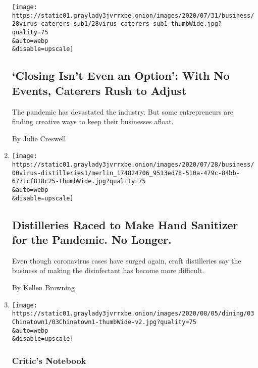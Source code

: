 \begin{enumerate}
  \texttt{[image: https://static01.graylady3jvrrxbe.onion/images/2020/07/31/business/28virus-caterers-sub1/28virus-caterers-sub1-thumbWide.jpg?quality=75\\\&auto=webp\\\&disable=upscale]}

  \hypertarget{closing-isnt-even-an-option-with-no-events-caterers-rush-to-adjust}{%
  \subsection{`Closing Isn't Even an Option': With No Events, Caterers
  Rush to
  Adjust}\label{closing-isnt-even-an-option-with-no-events-caterers-rush-to-adjust}}

  The pandemic has devastated the industry. But some entrepreneurs are
  finding creative ways to keep their businesses afloat.

  By Julie Creswell
\item
  \href{/2020/08/04/business/distilleries-hand-sanitizer-pandemic.html}{}

  \texttt{[image: https://static01.graylady3jvrrxbe.onion/images/2020/07/28/business/00virus-distilleries1/merlin\_174824706\_9513ed78-510a-479c-84bb-6771cf818c25-thumbWide.jpg?quality=75\\\&auto=webp\\\&disable=upscale]}

  \hypertarget{distilleries-raced-to-make-hand-sanitizer-for-the-pandemic-no-longer}{%
  \subsection{Distilleries Raced to Make Hand Sanitizer for the
  Pandemic. No
  Longer.}\label{distilleries-raced-to-make-hand-sanitizer-for-the-pandemic-no-longer}}

  Even though coronavirus cases have surged again, craft distilleries
  say the business of making the disinfectant has become more difficult.

  By Kellen Browning
\item
  \href{/2020/08/03/dining/chinatown-outdoor-dining-coronavirus.html}{}

  \texttt{[image: https://static01.graylady3jvrrxbe.onion/images/2020/08/05/dining/03Chinatown1/03Chinatown1-thumbWide-v2.jpg?quality=75\\\&auto=webp\\\&disable=upscale]}

  \hypertarget{critics-notebook-1}{%
  \subsubsection{Critic's Notebook}\label{critics-notebook-1}}


\end{enumerate}
